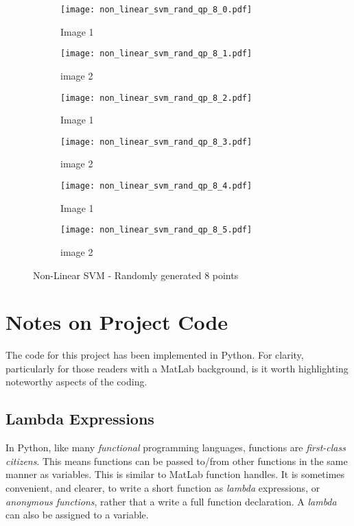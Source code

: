 \documentclass[10pt, a4paper,reqno]{amsart}
\begin{document}
\begin{figure}[H]
	\centering	
	\begin{subfigure}{0.5\textwidth}
		\centering
		\texttt{[image: non\_linear\_svm\_rand\_qp\_8\_0.pdf]}
		\caption{Image 1}
	\end{subfigure}%
	\begin{subfigure}{0.5\textwidth}
		\centering
		\texttt{[image: non\_linear\_svm\_rand\_qp\_8\_1.pdf]}
		\caption{image 2}
	\end{subfigure}
	\begin{subfigure}{0.5\textwidth}
		\centering
		\texttt{[image: non\_linear\_svm\_rand\_qp\_8\_2.pdf]}
		\caption{Image 1}
	\end{subfigure}%
	\begin{subfigure}{0.5\textwidth}
		\centering
		\texttt{[image: non\_linear\_svm\_rand\_qp\_8\_3.pdf]}
		\caption{image 2}
	\end{subfigure}
	\begin{subfigure}{0.5\textwidth}
		\centering
		\texttt{[image: non\_linear\_svm\_rand\_qp\_8\_4.pdf]}
		\caption{Image 1}
	\end{subfigure}%
	\begin{subfigure}{0.5\textwidth}
		\centering
		\texttt{[image: non\_linear\_svm\_rand\_qp\_8\_5.pdf]}
		\caption{image 2}
	\end{subfigure}
	\caption{Non-Linear SVM - Randomly generated 8 points}
\end{figure}


%
%
\clearpage\section{Notes on Project Code}

The code for this project has been implemented in Python. For clarity, particularly for those readers with a MatLab background, is it worth highlighting noteworthy aspects of the coding.

\subsection{Lambda Expressions}
In Python, like many \emph{functional} programming languages, functions are \emph{first-class citizens}. This means functions can be passed to/from other functions in the same manner as variables. This is similar to MatLab function handles. It is sometimes convenient, and clearer, to write a short function as \emph{lambda} expressions, or \emph{anonymous functions}, rather that a write a full function declaration. A \emph{lambda} can also be assigned to a variable.
\end{document}
